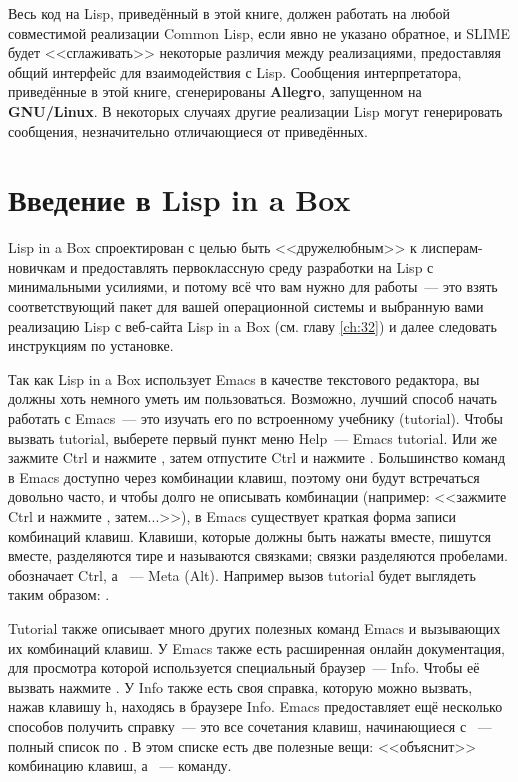 Весь код на Lisp, приведённый в этой книге, должен работать на любой совместимой
реализации Common Lisp, если явно не указано обратное, и SLIME будет <<сглаживать>>
некоторые различия между реализациями, предоставляя общий интерфейс для взаимодействия с
Lisp. Сообщения интерпретатора, приведённые в этой книге, сгенерированы \textbf{Allegro},
запущенном на \textbf{GNU/Linux}. В некоторых случаях другие реализации Lisp могут
генерировать сообщения, незначительно отличающиеся от приведённых.

\section{Введение в Lisp in a Box}

Lisp in a Box спроектирован с целью быть <<дружелюбным>> к лисперам-новичкам и предоставлять
первоклассную среду разработки на Lisp с минимальными усилиями, и потому всё что вам нужно
для работы~--- это взять соответствующий пакет для вашей операционной системы и выбранную
вами реализацию Lisp с веб-сайта Lisp in a Box (см. главу \ref{ch:32}) и далее следовать
инструкциям по установке.

Так как Lisp in a Box использует Emacs в качестве текстового редактора, вы должны хоть
немного уметь им пользоваться. Возможно, лучший способ начать работать с Emacs~--- это
изучать его по встроенному учебнику (tutorial). Чтобы вызвать tutorial, выберете первый
пункт меню Help~--- Emacs tutorial. Или же зажмите Ctrl и нажмите , затем отпустите Ctrl и
нажмите . Большинство команд в Emacs доступно через комбинации клавиш, поэтому они будут
встречаться довольно часто, и чтобы долго не описывать комбинации (например: <<зажмите Ctrl
и нажмите , затем...>>), в Emacs существует краткая форма записи комбинаций
клавиш. Клавиши, которые должны быть нажаты вместе, пишутся вместе, разделяются тире и
называются связками; связки разделяются пробелами.  обозначает Ctrl, а ~--- Meta
(Alt). Например вызов tutorial будет выглядеть таким образом: .

Tutorial также описывает много других полезных команд Emacs и вызывающих их комбинаций
клавиш. У Emacs также есть расширенная онлайн документация, для просмотра которой
используется специальный браузер~--- Info. Чтобы её вызвать нажмите . У Info также
есть своя справка, которую можно вызвать, нажав клавишу h, находясь в браузере Info. Emacs
предоставляет ещё несколько способов получить справку~--- это все сочетания клавиш,
начинающиеся с ~--- полный список по . В этом списке есть две
полезные вещи:  <<объяснит>> комбинацию клавиш, а ~--- команду.

